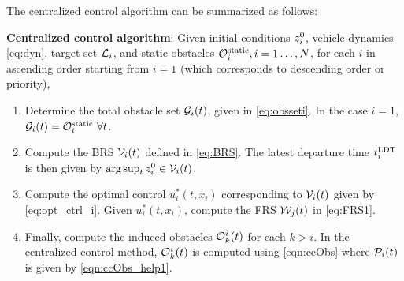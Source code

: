 The centralized control algorithm can be summarized as follows:
\begin{alg}
\label{alg:cc}
\textbf{Centralized control algorithm}: Given initial conditions $z_i^0$, vehicle dynamics \eqref{eq:dyn}, target set $\mathcal{L}_i$, and static obstacles $\mathcal{O}^\text{static}_i, i = 1\ldots, N$, for each $i$ in ascending order starting from $i=1$ (which corresponds to descending order or priority),
\begin{enumerate}
\item Determine the total obstacle set $\mathcal{G}_i(t)$, given in \eqref{eq:obsseti}. In the case $i=1$, $\mathcal{G}_i(t) = \mathcal{O}^\text{static}_i ~ \forall t$.
\item Compute the BRS $\mathcal{V}_i(t)$ defined in \eqref{eq:BRS}. The latest departure time $t^\text{LDT}_i$ is then given by $\arg \sup_t z^0_i \in \mathcal{V}_i(t)$.
\item Compute the optimal control $u_i^*(t,x_i)$ corresponding to $\mathcal{V}_i(t)$ given by \eqref{eq:opt_ctrl_i}. Given $u_i^*(t,x_i)$, compute the FRS $\mathcal{W}_j(t)$ in \eqref{eq:FRS1}.
\item Finally, compute the induced obstacles $\mathcal{O}_k^i(t)$ for each $k>i$. In the centralized control method, $\mathcal{O}_k^i(t)$ is computed using \eqref{eqn:ccObs} where $\mathcal{P}_i(t)$ is given by \eqref{eqn:ccObs_help1}.
\end{enumerate}
\end{alg}